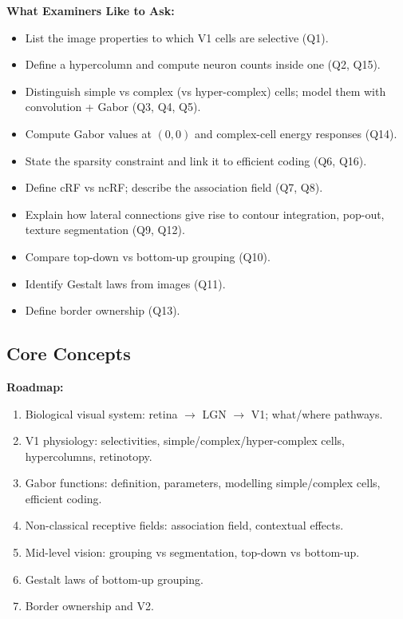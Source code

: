 \separator

\textbf{What Examiners Like to Ask:}
\begin{itemize}
  \item List the image properties to which V1 cells are selective (Q1).
  \item Define a hypercolumn and compute neuron counts inside one (Q2, Q15).
  \item Distinguish simple vs complex (vs hyper-complex) cells; model them with convolution + Gabor (Q3, Q4, Q5).
  \item Compute Gabor values at $(0,0)$ and complex-cell energy responses (Q14).
  \item State the sparsity constraint and link it to efficient coding (Q6, Q16).
  \item Define cRF vs ncRF; describe the association field (Q7, Q8).
  \item Explain how lateral connections give rise to contour integration, pop-out, texture segmentation (Q9, Q12).
  \item Compare top-down vs bottom-up grouping (Q10).
  \item Identify Gestalt laws from images (Q11).
  \item Define border ownership (Q13).
\end{itemize}

\subsection{Core Concepts}

\textbf{Roadmap:}
\begin{enumerate}
  \item Biological visual system: retina $\rightarrow$ LGN $\rightarrow$ V1; what/where pathways.
  \item V1 physiology: selectivities, simple/complex/hyper-complex cells, hypercolumns, retinotopy.
  \item Gabor functions: definition, parameters, modelling simple/complex cells, efficient coding.
  \item Non-classical receptive fields: association field, contextual effects.
  \item Mid-level vision: grouping vs segmentation, top-down vs bottom-up.
  \item Gestalt laws of bottom-up grouping.
  \item Border ownership and V2.
\end{enumerate}

